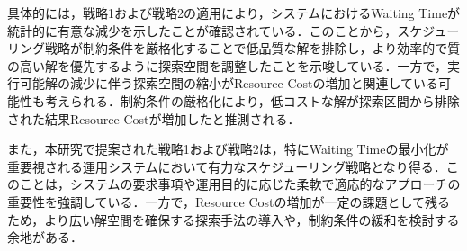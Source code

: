 具体的には，戦略1および戦略2の適用により，システムにおけるWaiting Timeが統計的に有意な減少を示したことが確認されている．このことから，スケジューリング戦略が制約条件を厳格化することで低品質な解を排除し，より効率的で質の高い解を優先するように探索空間を調整したことを示唆している．一方で，実行可能解の減少に伴う探索空間の縮小がResource Costの増加と関連している可能性も考えられる．制約条件の厳格化により，低コストな解が探索区間から排除された結果Resource Costが増加したと推測される．

また，本研究で提案された戦略1および戦略2は，特にWaiting Timeの最小化が重要視される運用システムにおいて有力なスケジューリング戦略となり得る．このことは，システムの要求事項や運用目的に応じた柔軟で適応的なアプローチの重要性を強調している．一方で，Resource Costの増加が一定の課題として残るため，より広い解空間を確保する探索手法の導入や，制約条件の緩和を検討する余地がある．
